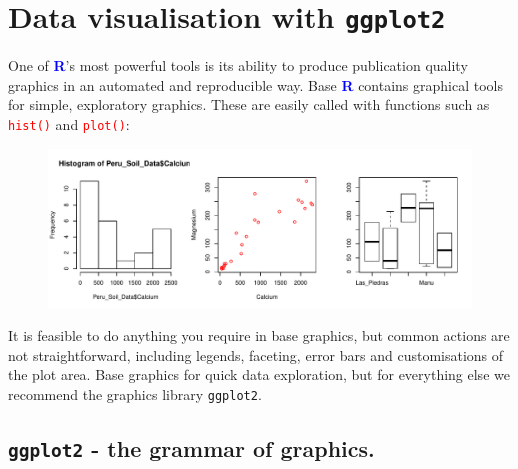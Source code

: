 \documentclass[a4paper,12pt]{article}
\newcommand\boldblue[1]{\textcolor{blue}{\textbf{#1}}}
\newcommand\code[1]{\textcolor{red}{\texttt{#1}}}
\begin{document}
\section{Data visualisation with \texttt{ggplot2}}

One of \boldblue{R}'s most powerful tools is its ability to produce publication quality graphics in an automated and reproducible way. Base \boldblue{R} contains graphical tools for simple, exploratory graphics. These are easily called with functions such as \code{hist()} and \code{plot()}:



\begin{shaded}
\begin{Schunk}
\end{Schunk}
\end{shaded}


\begin{figure}[h]
	\centering 
	\includegraphics[width=1\textwidth]{figs/base_graphs.pdf}
	\label{fig:Base_graphs}
\end{figure} 



It is feasible to do anything you require in base graphics, but common actions are not straightforward, including legends, faceting, error bars and customisations of the plot area. Base graphics for quick data exploration, but for everything else we recommend the graphics library \texttt{ggplot2}.

\subsection{\texttt{ggplot2} - the grammar of graphics.}
\end{document}
